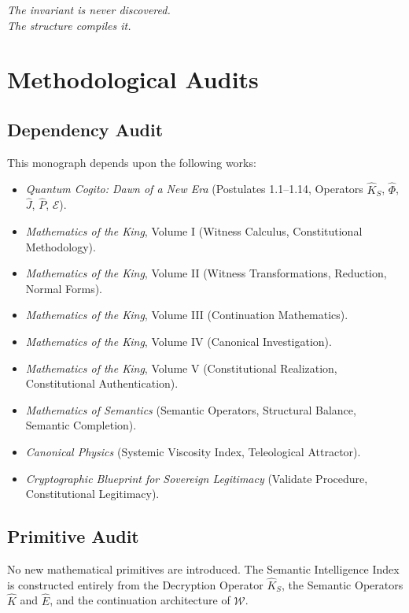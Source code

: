 \documentclass[12pt,anyside]{book}
\theoremstyle{plain}
\theoremstyle{definition}
\newcommand{\W}{\mathcal{W}}          %
\newcommand{\Khat}{\hat{K}_S}          %
\newcommand{\Ehat}{\hat{E}}            %
\newcommand{\Phihat}{\hat{\Phi}}       %
\newcommand{\Jhat}{\hat{J}}            %
\newcommand{\Phat}{\hat{P}}            %
\newcommand{\Ecal}{\hat{\mathcal{E}}}  %
\begin{document}
\vspace{2em}
\begin{flushright}
\textit{The invariant is never discovered.}\\
\textit{The structure compiles it.}
\end{flushright}

\appendix

\chapter{Methodological Audits}

\section{Dependency Audit}
This monograph depends upon the following works:
\begin{itemize}
\item \emph{Quantum Cogito: Dawn of a New Era} (Postulates 1.1--1.14, Operators $\Khat$, $\Phihat$, $\Jhat$, $\Phat$, $\Ecal$).
\item \emph{Mathematics of the King}, Volume I (Witness Calculus, Constitutional Methodology).
\item \emph{Mathematics of the King}, Volume II (Witness Transformations, Reduction, Normal Forms).
\item \emph{Mathematics of the King}, Volume III (Continuation Mathematics).
\item \emph{Mathematics of the King}, Volume IV (Canonical Investigation).
\item \emph{Mathematics of the King}, Volume V (Constitutional Realization, Constitutional Authentication).
\item \emph{Mathematics of Semantics} (Semantic Operators, Structural Balance, Semantic Completion).
\item \emph{Canonical Physics} (Systemic Viscosity Index, Teleological Attractor).
\item \emph{Cryptographic Blueprint for Sovereign Legitimacy} (Validate Procedure, Constitutional Legitimacy).
\end{itemize}

\section{Primitive Audit}
No new mathematical primitives are introduced. The Semantic Intelligence Index is constructed entirely from the Decryption Operator $\Khat$, the Semantic Operators $\hat{K}$ and $\Ehat$, and the continuation architecture of $\W$.
\end{document}
